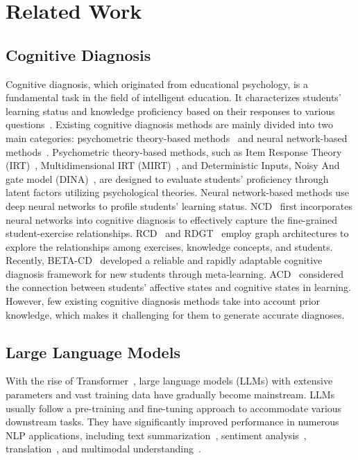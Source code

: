 \section{Related Work}

\subsection{Cognitive Diagnosis}
Cognitive diagnosis, which originated from educational psychology, is a fundamental task in the field of intelligent education. It characterizes students' learning status and knowledge proficiency based on their responses to various questions~\cite{liu2021towards}. Existing cognitive diagnosis methods are mainly divided into two main categories: psychometric theory-based methods~\cite{lord1952theory,de2009dina,reckase200618} and neural network-based methods~\cite{wang2020neural,gao2021rcd,bi2023beta,liu2024inductive,wang2023self}.
Psychometric theory-based methods, such as Item Response Theory (IRT)~\cite{lord1952theory}, Multidimensional IRT (MIRT)~\cite{reckase200618}, and Deterministic Inputs, Noisy And gate model (DINA)~\cite{de2009dina}, are designed to evaluate students' proficiency through latent factors utilizing psychological theories.
Neural network-based methods use deep neural networks to profile students' learning status. NCD~\cite{wang2020neural} first incorporates neural networks into cognitive diagnosis to effectively capture the fine-grained student-exercise relationships. RCD~\cite{gao2021rcd} and RDGT~\cite{yu2024rdgt} employ graph architectures to explore the relationships among exercises, knowledge concepts, and students. Recently, BETA-CD~\cite{bi2023beta} developed a reliable and rapidly adaptable cognitive diagnosis framework for new students through meta-learning. ACD~\cite{wang2024boosting} considered the connection between students' affective states and cognitive states in learning. However, few existing cognitive diagnosis methods take into account prior knowledge, which makes it challenging for them to generate accurate diagnoses. 

\subsection{Large Language Models}
With the rise of Transformer~\cite{vaswani2017attention}, large language models (LLMs) with extensive parameters and vast training data have gradually become mainstream. 
LLMs usually follow a pre-training and fine-tuning approach to accommodate various downstream tasks. They have significantly improved performance in numerous NLP applications, including text summarization~\cite{laskar2022domain,zhang2023summit}, sentiment analysis~\cite{hoang2019aspect,deng2023llms}, translation~\cite{zhang2023prompting,moslem2023adaptive}, and multimodal understanding~\cite{wu2024semantic,huang2024autogeo}. 


